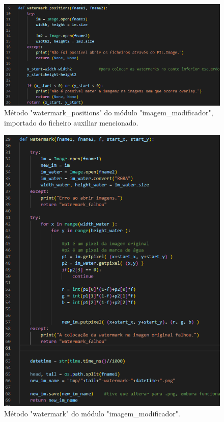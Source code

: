 \documentclass{report}
\begin{document}
\newpage
\begin{figure}[!hbtp]
        \centering
        \includegraphics[scale=0.57]{Images_code/12 - image manipulation app2 watermark positions.png}
        \caption{\label{Estrutura}Método "watermark\_positions" do módulo "imagem\_modificador", importado do ficheiro auxiliar mencionado.}
\end{figure}

\begin{figure}[!hbtp]
        \centering
        \includegraphics[scale=0.5]{Images_code/12 - image manipulation app2 watermark.png}
        \caption{\label{Estrutura}Método "watermark" do módulo "imagem\_modificador".}
\end{figure}
\newpage
\end{document}

